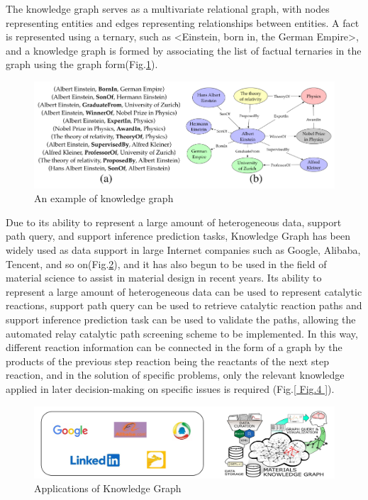 \documentclass[%
 aip,
 jmp,%
 amsmath,amssymb,
 reprint,%
]{revtex4-2}
\begin{document}
The knowledge graph serves as a multivariate relational graph\cite{cao2015g}, with nodes representing entities and edges representing relationships between entities. A fact is represented using a ternary, such as <Einstein, born in, the German Empire>, and a knowledge graph is formed by associating the list of factual ternaries in the graph using the graph form(Fig.\ref{ Fig.2 }).

\begin{figure}[htbp]
    \centering
    \includegraphics[width=1\textwidth]{figure/2.png}
    \caption{ An example of knowledge graph }
    \label{ Fig.2 }
\end{figure}

Due to its ability to represent a large amount of heterogeneous data\cite{castano2001global, wang2017heterogeneous, zuech2015intrusion}, support path query, and support inference prediction tasks\cite{chen2018variational}, Knowledge Graph has been widely used as data support in large Internet companies such as Google\cite{akerkar2009knowledge}, Alibaba\cite{li2020alimekg}, Tencent\cite{TencentKG}, and so on(Fig.\ref{ Fig.3 }), and it has also begun to be used in the field of material science to assist in material design in recent years\cite{mrdjenovich2020propnet, mccusker2020nanomine, zhao2021knowledge}. Its ability to represent a large amount of heterogeneous data can be used to represent catalytic reactions, support path query can be used to retrieve catalytic reaction paths and support inference prediction task can be used to validate the paths, allowing the automated relay catalytic path screening scheme to be implemented. In this way, different reaction information can be connected in the form of a graph by the products of the previous step reaction being the reactants of the next step reaction, and in the solution of specific problems, only the relevant knowledge applied in later decision-making on specific issues is required (Fig.\ref{ Fig.4 }).

\begin{figure}[htbp]
 \centering
 \includegraphics[width=1\textwidth]{figure/3.png}
 \caption{ Applications of Knowledge Graph }
 \label{ Fig.3 }
\end{figure}
\end{document}
